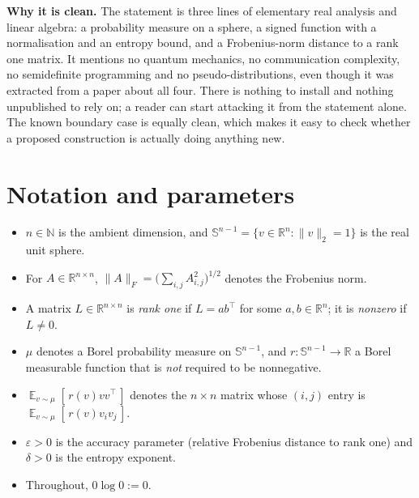 \documentclass{conjura-conjecture}
\newcommand{\Expect}{\operatorname*{\mathbb{E}}}
\newcommand{\Sph}{\mathbb{S}^{n-1}}
\newcommand{\Reals}{\mathbb{R}}
\newcommand{\Nat}{\mathbb{N}}
\begin{document}
\textbf{Why it is clean.} The statement is three lines of elementary
real analysis and linear algebra: a probability measure on a sphere, a
signed function with a normalisation and an entropy bound, and a
Frobenius-norm distance to a rank one matrix. It mentions no quantum
mechanics, no communication complexity, no semidefinite programming
and no pseudo-distributions, even though it was extracted from a paper
about all four. There is nothing to install and nothing unpublished to
rely on; a reader can start attacking it from the statement alone. The
known boundary case is equally clean, which makes it easy to check
whether a proposed construction is actually doing anything new.

\section{Notation and parameters}\label{sec:notation}

\begin{itemize}[leftmargin=1.2em]
\item $n \in \Nat$ is the ambient dimension, and $\Sph = \{ v \in
  \Reals^{n} : \|v\|_{2} = 1 \}$ is the real unit sphere.
\item For $A \in \Reals^{n \times n}$, $\|A\|_{F} = \big(\sum_{i,j}
  A_{i,j}^{2}\big)^{1/2}$ denotes the Frobenius norm.
\item A matrix $L \in \Reals^{n \times n}$ is \emph{rank one} if $L =
  a b^{\top}$ for some $a, b \in \Reals^{n}$; it is \emph{nonzero} if
  $L \neq 0$.
\item $\mu$ denotes a Borel probability measure on $\Sph$, and $r :
  \Sph \to \Reals$ a Borel measurable function that is \emph{not}
  required to be nonnegative.
\item $\Expect_{v \sim \mu}[\, r(v) v v^{\top} \,]$ denotes the $n
  \times n$ matrix whose $(i,j)$ entry is $\Expect_{v \sim \mu}[\,
  r(v) v_{i} v_{j} \,]$.
\item $\varepsilon > 0$ is the accuracy parameter (relative Frobenius
  distance to rank one) and $\delta > 0$ is the entropy exponent.
\item Throughout, $0 \log 0 := 0$.
\end{itemize}
\end{document}
